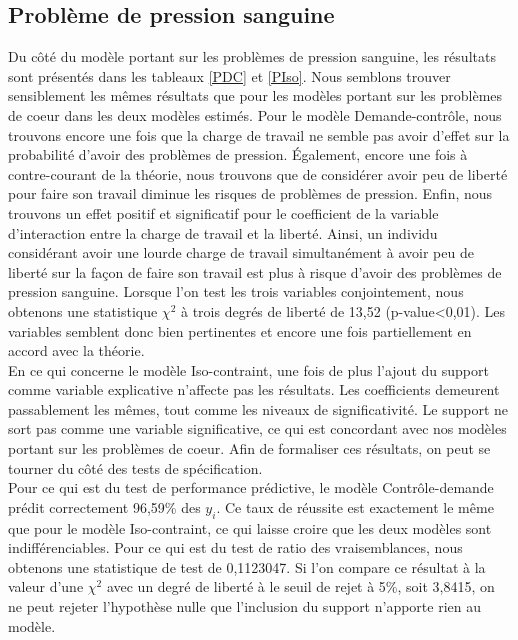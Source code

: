 \documentclass[a4paper, oneside, titlepage]{article}
\begin{document}
\subsection{Problème de pression sanguine}
Du côté du modèle portant sur les problèmes de pression sanguine, les résultats sont présentés dans les tableaux \ref{PDC} et \ref{PIso}. Nous semblons trouver sensiblement les mêmes résultats que pour les modèles portant sur les problèmes de coeur dans les deux modèles estimés. Pour le modèle Demande-contrôle, nous trouvons encore une fois que la charge de travail ne semble pas avoir d'effet sur la probabilité d'avoir des problèmes de pression. Également, encore une fois à contre-courant de la théorie, nous trouvons que de considérer avoir peu de liberté pour faire son travail diminue les risques de problèmes de pression. Enfin, nous trouvons un effet positif et significatif pour le coefficient de la variable d'interaction entre la charge de travail et la liberté. Ainsi, un individu considérant avoir une lourde charge de travail simultanément à avoir peu de liberté sur la façon de faire son travail est plus à risque d'avoir des problèmes de pression sanguine. Lorsque l'on test les trois variables conjointement, nous obtenons une statistique $\chi^2$ à trois degrés de liberté de 13,52 (p-value<0,01). Les variables semblent donc bien pertinentes et encore une fois partiellement en accord avec la théorie.
\\
En ce qui concerne le modèle Iso-contraint, une fois de plus l'ajout du support comme variable explicative n'affecte pas les résultats. Les coefficients demeurent passablement les mêmes, tout comme les niveaux de significativité. Le support ne sort pas comme une variable significative, ce qui est concordant avec nos modèles portant sur les problèmes de coeur. Afin de formaliser ces résultats, on peut se tourner du côté des tests de spécification.
\\
Pour ce qui est du test de performance prédictive, le modèle Contrôle-demande prédit correctement 96,59\% des $y_i$. Ce taux de réussite est exactement le même que pour le modèle Iso-contraint, ce qui laisse croire que les deux modèles sont indifférenciables. Pour ce qui est du test de ratio des vraisemblances, nous obtenons une statistique de test de 0,1123047. Si l'on compare ce résultat à la valeur d'une $\chi^2$ avec un degré de liberté à le seuil de rejet à 5\%, soit 3,8415, on ne peut rejeter l'hypothèse nulle que l'inclusion du support n'apporte rien au modèle.
\\
\\
\end{document}
